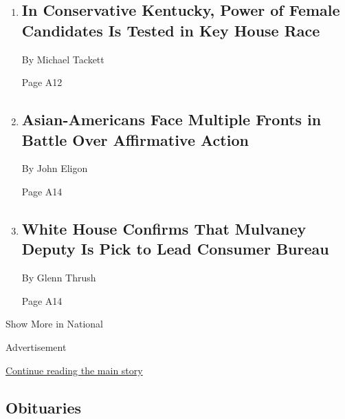 \begin{enumerate}
\def\labelenumi{\arabic{enumi}.}
\item
  \href{/2018/06/16/us/politics/kentucky-house-race-mcgrath.html}{}

  \hypertarget{in-conservative-kentucky-power-of-female-candidates-is-tested-in-key-house-race-1}{%
  \subsection{In Conservative Kentucky, Power of Female Candidates Is
  Tested in Key House
  Race}\label{in-conservative-kentucky-power-of-female-candidates-is-tested-in-key-house-race-1}}

  By Michael Tackett

  Page A12
\item
  \href{/2018/06/16/us/affirmative-action-asian-americans.html}{}

  \hypertarget{asian-americans-face-multiple-fronts-in-battle-over-affirmative-action}{%
  \subsection{Asian-Americans Face Multiple Fronts in Battle Over
  Affirmative
  Action}\label{asian-americans-face-multiple-fronts-in-battle-over-affirmative-action}}

  By John Eligon

  Page A14
\item
  \href{/2018/06/16/us/politics/kraninger-consumer-financial-bureau.html}{}

  \hypertarget{white-house-confirms-that-mulvaney-deputy-is-pick-to-lead-consumer-bureau}{%
  \subsection{White House Confirms That Mulvaney Deputy Is Pick to Lead
  Consumer
  Bureau}\label{white-house-confirms-that-mulvaney-deputy-is-pick-to-lead-consumer-bureau}}

  By Glenn Thrush

  Page A14
\end{enumerate}

Show More in National

Advertisement

\protect\hyperlink{after-mid2}{Continue reading the main story}

\hypertarget{obituaries}{%
\subsection{Obituaries}\label{obituaries}}


